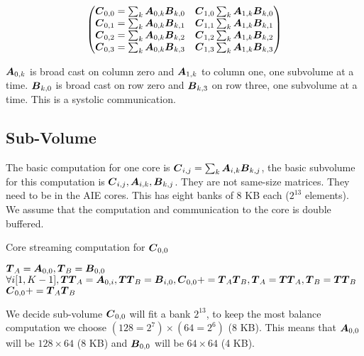 \documentclass[journal]{IEEEtran}
\begin{document}
{\small \begin{equation}
  \label{eq:gemm-fatc}
  \begin{pmatrix}
    \Vc{C}_{0,0} = \sum_k \Vc{A}_{0,k}\Vc{B}_{k,0} & \Vc{C}_{1,0} \sum_k \Vc{A}_{1,k}\Vc{B}_{k,0}\\
    \Vc{C}_{0,1} = \sum_k \Vc{A}_{0,k}\Vc{B}_{k,1} & \Vc{C}_{1,1} \sum_k \Vc{A}_{1,k}\Vc{B}_{k,1}\\
    \Vc{C}_{0,2} = \sum_k \Vc{A}_{0,k}\Vc{B}_{k,2} & \Vc{C}_{1,2} \sum_k \Vc{A}_{1,k}\Vc{B}_{k,2}\\
    \Vc{C}_{0,3} = \sum_k \Vc{A}_{0,k}\Vc{B}_{k,3} & \Vc{C}_{1,3} \sum_k \Vc{A}_{1,k}\Vc{B}_{k,3}\\
  \end{pmatrix}  
\end{equation}
}

${\boldsymbol A}_{0,k}$ is broad cast on column zero and ${\boldsymbol A}_{1,k}$ to
column one, one subvolume at a time. ${\boldsymbol B}_{k,0}$ is broad cast on
row zero and ${\boldsymbol B}_{k,3}$ on row three, one subvolume at a
time. This is a systolic communication.

\subsection{Sub-Volume}
The basic computation for one core is ${\boldsymbol C}_{i,j} = \sum_k
{\boldsymbol A}_{i,k}{\boldsymbol B}_{k,j}$, the basic subvolume for this computation is
${\boldsymbol C}_{i,j}, {\boldsymbol A}_{i,k},{\boldsymbol B}_{k,j}$. They are not same-size matrices. They need to be in the AIE cores. This has eight banks of 8
KB each ($2^{13}$ elements).  We assume that the computation and
communication to the core is double buffered.
\begin{algorithm}
  \caption{Core streaming computation for ${\boldsymbol C}_{0,0}$}
  \label{alg:one}
  \begin{algorithmic}[1]
    \STATE ${\boldsymbol T}_A = {\boldsymbol A}_{0,0}, {\boldsymbol T}_B = {\boldsymbol B}_{0,0}$ 
    \STATE $\forall i [1,K-1], {\boldsymbol {TT}}_A = {\boldsymbol A}_{0,i} , {\boldsymbol {TT}}_B = {\boldsymbol B}_{i,0},    {\boldsymbol C}_{0,0} += {\boldsymbol T}_{A}{\boldsymbol T}_{B}, {\boldsymbol T}_A = {\boldsymbol {TT}}_{A} , {\boldsymbol T}_B = {\boldsymbol {TT}}_B$ 
    \STATE ${\boldsymbol C}_{0,0} += {\boldsymbol T}_{A}{\boldsymbol T}_{B}$ 
  \end{algorithmic}  
\end{algorithm}

We decide sub-volume ${\boldsymbol C}_{0,0}$ will fit a bank $2^{13}$, to keep
the most balance computation we choose $(128=2^7) \times (64=2^6)$ (8
KB). This means that ${\boldsymbol A}_{0,0}$ will be $128 \times 64$ (8 KB) and
${\boldsymbol B}_{0,0}$ will be $64 \times 64$ (4 KB).
\end{document}
